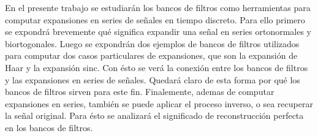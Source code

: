 
	En el presente trabajo se estudiarán los bancos de filtros como herramientas para computar expansiones en series de señales en tiempo discreto. Para ello primero se expondrá brevemente qué significa expandir una señal en series ortonormales y biortogonales. Luego se expondrán dos ejemplos de bancos de filtros utilizados para computar dos casos particulares de expansiones, que son la expansión de Haar y la expansión sinc. Con ésto se verá la conexión entre los bancos de filtros y las expansiones en series de señales. Quedará claro de esta forma por qué los bancos de filtros sirven para este fin. Finalemente, ademas de computar expansiones en series, también se puede aplicar el proceso inverso, o sea recuperar la señal original. Para ésto se analizará el significado de reconstrucción perfecta en los bancos de filtros.
